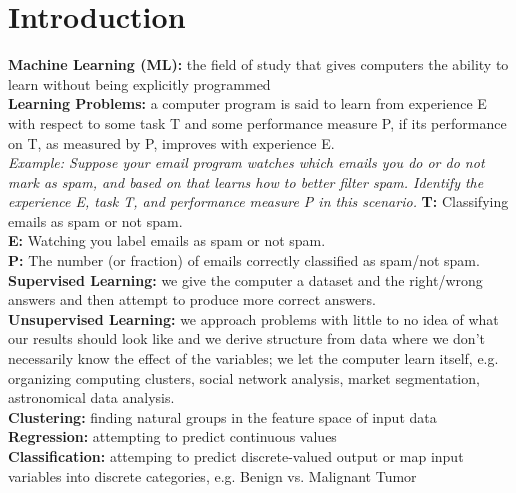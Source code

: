 \section{Introduction}
\noindent \textbf{Machine Learning (ML):} the field of study that gives computers the ability to learn
without being explicitly programmed \\
\noindent \textbf{Learning Problems:} a computer program is said to learn from experience E with respect to some
task T and some performance measure P, if its performance on T, as measured by P, improves with
experience E. \\

\noindent \textit{Example: Suppose your email program watches which emails you do or do not mark as spam, and based on
that learns how to better filter spam. Identify the experience E, task T, and performance measure P
in this scenario.}
\noindent \textbf{T:} Classifying emails as spam or not spam. \\
\noindent \textbf{E:} Watching you label emails as spam or not spam. \\
\noindent \textbf{P:} The number (or fraction) of emails correctly classified as spam/not spam. \\

\noindent \textbf{Supervised Learning:} we give the computer a dataset and the right/wrong answers
and then attempt to produce more correct answers. \\
\noindent \textbf{Unsupervised Learning:} we approach problems with little to no idea of what our
results should look like and we derive structure from data where we don't necessarily know the effect
of the variables; we let the computer learn itself, e.g. organizing computing clusters, social network
analysis, market segmentation, astronomical data analysis. \\

\noindent \textbf{Clustering:} finding natural groups in the feature space of input data \\
\noindent \textbf{Regression:} attempting to predict continuous values \\
\noindent \textbf{Classification:} attemping to predict discrete-valued output or map input variables
into discrete categories, e.g. Benign vs. Malignant Tumor \\



\pagebreak
